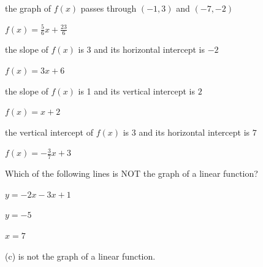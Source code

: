 \begin{exercise}
the graph of $f(x)$ passes through $(-1,3)$ and $(-7,-2)$
\end{exercise}

\begin{solution}
    $f(x)=\frac{5}{6}x+\frac{23}{6}$
\end{solution}



\begin{exercise}
the slope of $f(x)$ is 3 and its horizontal intercept is $-2$
\end{exercise}

\begin{solution}
    $f(x)=3x+6$
\end{solution}



\begin{exercise}
the slope of $f(x)$ is 1 and its vertical intercept is $2$
\end{exercise}

\begin{solution}
    $f(x)=x+2$
\end{solution}



\begin{exercise}\label{exercise-2.2.16}
the vertical intercept of $f(x)$ is $3$ and its horizontal intercept is $7$
\end{exercise}

\begin{solution}
    $f(x)=-\frac{3}{7}x+3$
\end{solution}






\begin{exercise}
Which of the following lines is NOT the graph of a linear function?
    \begin{parts}
        \item $\displaystyle y=-2x-3x+1$
        \item $\displaystyle y=-5$
        \item $x=7$
    \end{parts}
\end{exercise}


\begin{solution}
(c) is not the graph of a linear function.
\end{solution}





